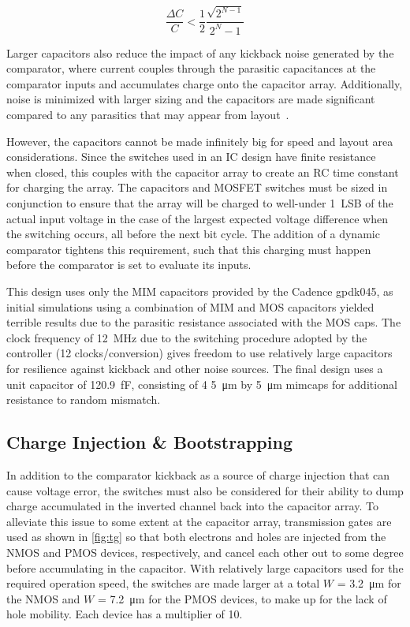 \documentclass[11pt,letterpaper]{article}
\begin{document}
\begin{equation}
    \frac{\Delta C}{C} < \frac{1}{2}\frac{\sqrt{2^{N-1}}}{2^N-1} \label{eq:cap_mc}
\end{equation}

Larger capacitors also reduce the impact of any kickback noise generated by the comparator, where current couples through the parasitic capacitances at the comparator inputs and accumulates charge onto the capacitor array. Additionally,  noise is minimized with larger sizing and the capacitors are made significant compared to any parasitics that may appear from layout~\cite{Alvarez-Fontecilla2019,Brenna2015}.

However, the capacitors cannot be made infinitely big for speed and layout area considerations. Since the switches used in an IC design have finite resistance when closed, this couples with the capacitor array to create an RC time constant for charging the array. The capacitors and MOSFET switches must be sized in conjunction to ensure that the array will be charged to well-under \qty{1}{LSB} of the actual input voltage in the case of the largest expected voltage difference when the switching occurs, all before the next bit cycle. The addition of a dynamic comparator tightens this requirement, such that this charging must happen before the comparator is set to evaluate its inputs. 

This design uses only the MIM capacitors provided by the Cadence gpdk045, as initial simulations using a combination of MIM and MOS capacitors yielded terrible results due to the parasitic resistance associated with the MOS caps. The clock frequency of \qty{12}{\MHz} due to the switching procedure adopted by the controller (12 clocks/conversion) gives freedom to use relatively large capacitors for resilience against kickback and other noise sources. The final design uses a unit capacitor of \qty{120.9}{\fF}, consisting of 4 \qty{5}{\um} by \qty{5}{\um} mimcaps for additional resistance to random mismatch. 

\subsection{Charge Injection \& Bootstrapping}

In addition to the comparator kickback as a source of charge injection that can cause voltage error, the switches must also be considered for their ability to dump charge accumulated in the inverted channel back into the capacitor array. To alleviate this issue to some extent at the capacitor array, transmission gates are used as shown in \cref{fig:tg} so that both electrons and holes are injected from the NMOS and PMOS devices, respectively, and cancel each other out to some degree before accumulating in the capacitor. With relatively large capacitors used for the required operation speed, the switches are made larger at a total \(W\) = \qty{3.2}{\um} for the NMOS and \(W\) = \qty{7.2}{\um} for the PMOS devices, to make up for the lack of hole mobility. Each device has a multiplier of 10.
\end{document}

